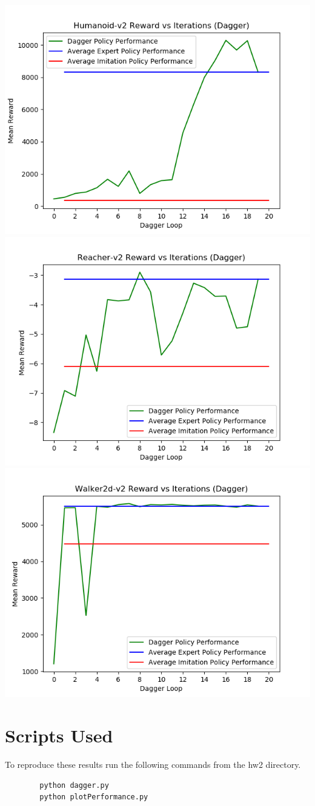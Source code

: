 \documentclass{article}
\begin{document}
    \includegraphics[scale=0.4]{Humanoid-v2Dagger}\\
    \includegraphics[scale=0.4]{Reacher-v2Dagger}
    \includegraphics[scale=0.4]{Walker2d-v2Dagger}\\

    \section{Scripts Used}

    To reproduce these results run the following commands from the hw2 directory.

    \begin{verbatim}
        python dagger.py
        python plotPerformance.py
    \end{verbatim}
\end{document}
